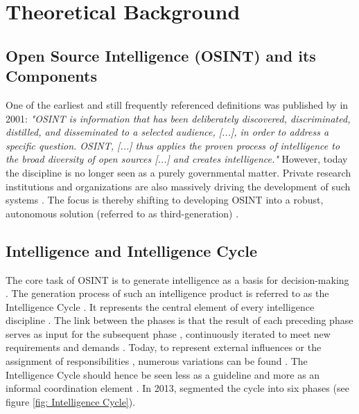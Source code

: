 \documentclass[10pt]{article}
\begin{document}
\section{Theoretical Background} \label{sec:theoreticalbackground}


\subsection{Open Source Intelligence (OSINT) and its Components}

One of the earliest and still frequently referenced definitions \cite{DosPassos.2017}
was published by \cite{NorthAtlanticTreatyOrganization.2001} in 2001: \textit{"OSINT is information that has been
    deliberately discovered, discriminated, distilled, and disseminated to a selected audience,
    [...], in order to address a specific question. OSINT, [...] thus applies the proven
    process of intelligence to the broad diversity of open sources [...] and creates
    intelligence."} However, today the discipline is no longer seen as a purely governmental
matter. Private research institutions and organizations \cite{Bohm.2021,Mercado.2005} are
also massively driving the development of such systems
\cite{Dokman.2020, Ghioni.2023}. The focus is thereby shifting to
developing OSINT into a robust, autonomous solution (referred to as third-generation) \cite{PastorGalindo.2019}.

\subsection{Intelligence and Intelligence Cycle}

The core task of OSINT is to generate intelligence as a basis for decision-making
\cite{Breakspear.2013,NorthAtlanticTreatyOrganization.2001}. The generation process of such an intelligence product
is referred to as the Intelligence Cycle \cite{CentralIntelligenceAgency.1987}.
It represents the central element of every intelligence discipline \cite{Reuser.2017}.
The link between the phases is that the result of each preceding phase serves as input for the subsequent phase \cite{JointChiefsofStaffU.S.Army.2013}, continuously iterated to meet new requirements and demands \cite{Gibson.2016}.
Today, to represent external influences or the assignment of responsibilities \cite{Lowenthal.2020,Phythian.2013}, numerous
variations can be found \cite{Reuser.2017}. The Intelligence Cycle should hence be seen less as a guideline and more as an informal
coordination element \cite{Hwang.2022}. In 2013, \cite{JointChiefsofStaffU.S.Army.2013} segmented the cycle into six phases  (see figure \ref{fig: Intelligence Cycle}).
\end{document}
